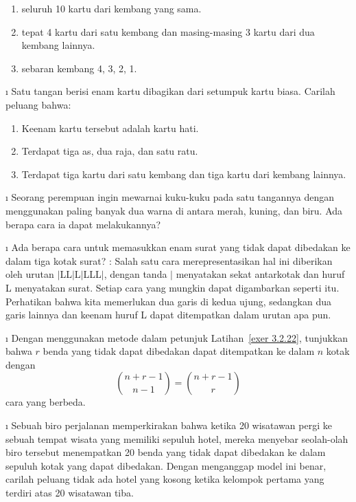 \begin{LJSItem}
\begin{enumerate}
\item seluruh 10 kartu dari kembang yang sama.

\item tepat 4 kartu dari satu kembang dan masing-masing 3 kartu dari dua kembang lainnya.

\item sebaran kembang 4, 3, 2, 1.
\end{enumerate}

\i\label{exer 3.2.20} Satu tangan berisi enam kartu dibagikan dari setumpuk kartu
biasa.  Carilah peluang bahwa:
\begin{enumerate}
\item Keenam kartu tersebut adalah kartu hati.

\item Terdapat tiga as, dua raja, dan satu ratu.

\item Terdapat tiga kartu dari satu kembang dan tiga kartu dari kembang lainnya.
\end{enumerate}

\i\label{exer 3.2.21} Seorang perempuan ingin mewarnai kuku-kuku pada satu tangannya
dengan menggunakan paling banyak dua warna di antara merah, kuning, dan biru.  Ada
berapa cara ia dapat melakukannya?

\i\label{exer 3.2.22} Ada berapa cara untuk memasukkan enam surat yang tidak dapat
dibedakan ke dalam tiga kotak surat?  : Salah satu cara merepresentasikan
hal ini diberikan oleh urutan $|$LL$|$L$|$LLL$|$, dengan tanda $|$ menyatakan sekat
antarkotak dan huruf L menyatakan surat.  Setiap cara yang mungkin dapat digambarkan
seperti itu.  Perhatikan bahwa kita memerlukan dua garis di kedua ujung, sedangkan dua
garis lainnya dan keenam huruf L dapat ditempatkan dalam urutan apa pun.

\i\label{exer 3.2.23} Dengan menggunakan metode dalam petunjuk
Latihan~\ref{exer 3.2.22}, tunjukkan bahwa $r$ benda yang tidak dapat dibedakan dapat
ditempatkan ke dalam $n$ kotak dengan
$$
 {{n + r - 1} \choose {n - 1}} = {{n + r - 1} \choose r}
$$ cara yang berbeda.

\i\label{exer 3.2.24} Sebuah biro perjalanan memperkirakan bahwa ketika 20 wisatawan
pergi ke sebuah tempat wisata yang memiliki sepuluh hotel, mereka menyebar seolah-olah
biro tersebut menempatkan 20 benda yang tidak dapat dibedakan ke dalam sepuluh kotak
yang dapat dibedakan.  Dengan menganggap model ini benar, carilah peluang tidak ada
hotel yang kosong ketika kelompok pertama yang terdiri atas 20 wisatawan tiba.


\end{LJSItem}

